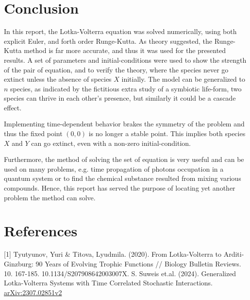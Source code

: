 \documentclass[a4paper]{article}
\newcommand{\newparagraph}{\vspace{.5cm}\noindent}
\begin{document}
\section{Conclusion}
In this report, the Lotka-Volterra equation was solved numerically, using both explicit Euler, and forth order Runge-Kutta. As theory suggested, the Runge-Kutta method is far more accurate, and thus it was used for the presented results. A set of parameters and initial-conditions were used to show the strength of the pair of equation, and to verify the theory, where the species never go extinct unless the absence of species $X$ initially.
The model can be generalized to $n$ species, as indicated by the fictitious extra study of a symbiotic life-form, two species can thrive in each other's presence, but similarly it could be a cascade effect.

\newparagraph
Implementing time-dependent behavior brakes the symmetry of the problem and thus the fixed point $(0,0)$ is no longer a stable point. This implies both species $X$ and $Y$ can go extinct, even with a non-zero initial-condition.

\newparagraph
Furthermore, the method of solving the set of equation is very useful and can be used on many problems, e.g. time propagation of photons occupation in a quantum system or to find the chemical substance resulted from mixing various compounds. Hence, this report has served the purpose of locating yet another problem the method can solve.

\newpage

\section{References}
{
[1] Tyutyunov, Yuri \& Titova, Lyudmila. (2020). From Lotka-Volterra to Arditi-Ginzburg: 90 Years of Evolving Trophic Functions // Biology Bulletin Reviews. 10. 167-185. 10.1134/S207908642003007X.
\vspace{0.5cm}
\noindent
[2] S. Suweis et.al. (2024). Generalized Lotka-Volterra Systems with Time Correlated Stochastic Interactions. \url{arXiv:2307.02851v2} 
}
\end{document}
